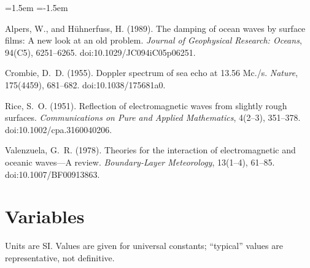 \documentclass[11pt, oneside]{article}
\begin{document}
{\raggedright
\begin{list}{}{\leftmargin=1.5em \itemindent=-1.5em \itemsep=4pt}
	\item Alpers, W., and H\"uhnerfuss, H. (1989). The damping of ocean waves by surface films: A new look at an old problem. \textit{Journal of Geophysical Research: Oceans}, 94(C5), 6251--6265. doi:10.1029/JC094iC05p06251.
	\item Crombie, D.~D. (1955). Doppler spectrum of sea echo at 13.56 Mc./s. \textit{Nature}, 175(4459), 681--682. doi:10.1038/175681a0.
	\item Rice, S.~O. (1951). Reflection of electromagnetic waves from slightly rough surfaces. \textit{Communications on Pure and Applied Mathematics}, 4(2--3), 351--378. doi:10.1002/cpa.3160040206.
	\item Valenzuela, G.~R. (1978). Theories for the interaction of electromagnetic and oceanic waves---A review. \textit{Boundary-Layer Meteorology}, 13(1--4), 61--85. doi:10.1007/BF00913863.
\end{list}
\par}

\clearpage
\section*{Variables}

Units are SI. Values are given for universal constants; ``typical'' values are representative, not definitive.
\end{document}
